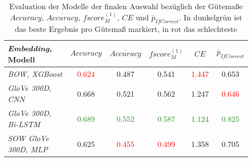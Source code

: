 \documentclass[a4paper,11pt]{article}
\begin{document}
\begin{table}[ht]
\centering
\begin{tabular}{|l||ccccc|}
  \hline
\textit{Embedding}, Modell & $Accuracy$ & $\overline{Accuracy}$ & $fscore_M^{(1)}$ & $CE$ & $\bar{p}_{IfCorrect}$ \\ 
  \hline
\textit{BOW, XGBoost} & \textcolor{red}{0.624} & 0.487 & 0.541 & \textcolor{red}{1.447} & 0.653 \\ 
  \textit{GloVe 300D, CNN} & 0.668 & 0.521 & 0.562 & 1.247 & \textcolor{red}{0.646} \\ 
  \textit{GloVe 300D, Bi-LSTM} & \textcolor{ForestGreen}{0.689} & \textcolor{ForestGreen}{0.552} & \textcolor{ForestGreen}{0.587} & \textcolor{ForestGreen}{1.124} & \textcolor{ForestGreen}{0.825} \\ 
  \textit{SOW GloVe 300D, MLP} & 0.625 & \textcolor{red}{0.455} & \textcolor{red}{0.499} & 1.358 & 0.705 \\ 
   \hline
\end{tabular}
\caption{Evaluation der Modelle der finalen Auswahl bezüglich der Gütemaße $Accuracy$, $\overline{Accuracy}$, $fscore_M^{(1)}$, $CE$ und  $\bar{p}_{IfCorrect}$. In dunkelgrün ist das beste Ergebnis pro Gütemaß markiert, in rot das schlechteste}
\label{tab:finalSelection}

\end{table}
\end{document}

